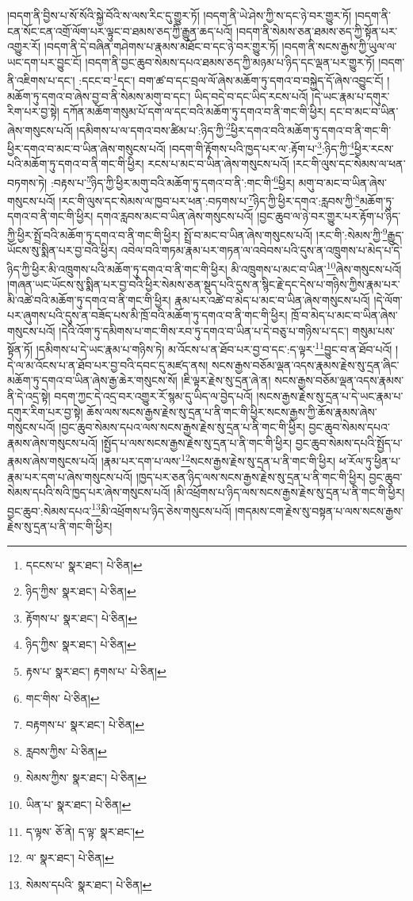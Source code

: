 །བདག་ནི་བྱིས་པ་སོ་སོའི་སྐྱེ་བོའི་ས་ལས་རིང་དུ་གྱུར་ཏོ། །བདག་ནི་ཡེ་ཤེས་ཀྱི་ས་དང་ཉེ་བར་གྱུར་ཏོ། །བདག་ནི་ངན་སོང་ངན་འགྲོ་ལོག་པར་ལྟུང་བ་ཐམས་ཅད་ཀྱི་རྒྱུན་ཆད་པའོ། །བདག་ནི་སེམས་ཅན་ཐམས་ཅད་ཀྱི་སྟོན་པར་འགྱུར་རོ། །བདག་ནི་དེ་བཞིན་གཤེགས་པ་རྣམས་མཐོང་བ་དང་ཉེ་བར་གྱུར་ཏོ། །བདག་ནི་སངས་རྒྱས་ཀྱི་ཡུལ་ལ་ཡང་དག་པར་བྱུང་ངོ། །བདག་ནི་བྱང་ཆུབ་སེམས་དཔའ་ཐམས་ཅད་ཀྱི་མཉམ་པ་ཉིད་དང་ལྡན་པར་གྱུར་ཏོ། །བདག་ནི་འཇིགས་པ་དང་། :དངང་བ་\footnote{དངངས་པ་  སྣར་ཐང་།  པེ་ཅིན། }དང་། བག་ཚ་བ་དང་བྲལ་ལོ་ཞེས་མཆོག་ཏུ་དགའ་བ་བསྐྱེད་དོ་ཞེས་འབྱུང་ངོ། །མཆོག་ཏུ་དགའ་བ་ཞེས་བྱ་བ་ནི་སེམས་མགུ་བ་དང་། ཡིད་བདེ་བ་དང་ཡིད་རངས་པའོ། །དེ་ཡང་རྣམ་པ་དགུར་རིག་པར་བྱ་སྟེ། དཀོན་མཆོག་གསུམ་པོ་དག་ལ་དང་བའི་མཆོག་ཏུ་དགའ་བ་ནི་གང་གི་ཕྱིར། དང་བ་མང་བ་ཡིན་ཞེས་གསུངས་པའོ། །དམིགས་པ་ལ་དགའ་བས་ཚིམ་པ་:ཉིད་ཀྱི་\footnote{ཉིད་ཀྱིས་  སྣར་ཐང་།  པེ་ཅིན། }ཕྱིར་དགའ་བའི་མཆོག་ཏུ་དགའ་བ་ནི་གང་གི་ཕྱིར་དགའ་བ་མང་བ་ཡིན་ཞེས་གསུངས་པའོ། །བདག་གི་རྟོགས་པའི་ཁྱད་པར་ལ་:རྟོག་པ་\footnote{རྟོགས་པ་  སྣར་ཐང་།  པེ་ཅིན། }:ཉིད་ཀྱི་\footnote{ཉིད་ཀྱིས་  སྣར་ཐང་།  པེ་ཅིན། }ཕྱིར་རངས་པའི་མཆོག་ཏུ་དགའ་བ་ནི་གང་གི་ཕྱིར། རངས་པ་མང་བ་ཡིན་ཞེས་གསུངས་པའོ། །རང་གི་ལུས་དང་སེམས་ལ་ཕན་བཏགས་ཏེ། :བརྟས་པ་\footnote{རྟས་པ་  སྣར་ཐང་། རྟགས་པ་  པེ་ཅིན། }ཉིད་ཀྱི་ཕྱིར་མགུ་བའི་མཆོག་ཏུ་དགའ་བ་ནི་:གང་གི་\footnote{གང་གིས་  པེ་ཅིན། }ཕྱིར། མགུ་བ་མང་བ་ཡིན་ཞེས་གསུངས་པའོ། །རང་གི་ལུས་དང་སེམས་ལ་ཁྱབ་པར་ཕན་:བཏགས་པ་\footnote{བརྟགས་པ་  སྣར་ཐང་།  པེ་ཅིན། }ཉིད་ཀྱི་ཕྱིར་དགའ་:རླབས་ཀྱི་\footnote{རླབས་ཀྱིས་  པེ་ཅིན། }མཆོག་ཏུ་དགའ་བ་ནི་གང་གི་ཕྱིར། དགའ་རླབས་མང་བ་ཡིན་ཞེས་གསུངས་པའོ། །བྱང་ཆུབ་ལ་ཉེ་བར་གྱུར་པར་རྟོག་པ་ཉིད་ཀྱི་ཕྱིར་སྤྲོ་བའི་མཆོག་ཏུ་དགའ་བ་ནི་གང་གི་ཕྱིར། སྤྲོ་བ་མང་བ་ཡིན་ཞེས་གསུངས་པའོ། །རང་གི་:སེམས་ཀྱི་\footnote{སེམས་ཀྱིས་  སྣར་ཐང་།  པེ་ཅིན། }རྒྱུད་ཡོངས་སུ་སྨིན་པར་བྱ་བའི་ཕྱིར། འབེལ་བའི་གཏམ་རྣམ་པར་གཏན་ལ་འབེབས་པའི་དུས་ན་འཁྲུགས་པ་མེད་པ་དེ་ཉིད་ཀྱི་ཕྱིར་མི་འཁྲུགས་པའི་མཆོག་ཏུ་དགའ་བ་ནི་གང་གི་ཕྱིར། མི་འཁྲུགས་པ་མང་བ་ཡིན་\footnote{ཡིན་པ་  སྣར་ཐང་།  པེ་ཅིན། }ཞེས་གསུངས་པའོ། །གཞན་ཡང་ཡོངས་སུ་སྨིན་པར་བྱ་བའི་ཕྱིར་སེམས་ཅན་སྡུད་པའི་དུས་ན་སྙིང་རྗེ་དང་དེས་པ་གཉིས་ཀྱིས་རྣམ་པར་མི་འཚེ་བའི་མཆོག་ཏུ་དགའ་བ་ནི་གང་གི་ཕྱིར། རྣམ་པར་འཚེ་བ་མེད་པ་མང་བ་ཡིན་ཞེས་གསུངས་པའོ། །དེ་ལོག་པར་ཞུགས་པའི་དུས་ན་བཟོད་པས་མི་ཁྲོ་བའི་མཆོག་ཏུ་དགའ་བ་ནི་གང་གི་ཕྱིར། ཁྲོ་བ་མེད་པ་མང་བ་ཡིན་ཞེས་གསུངས་པའོ། །དེའི་འོག་ཏུ་དམིགས་པ་གང་གིས་རབ་ཏུ་དགའ་བ་ཡིན་པ་དེ་བཅུ་པ་གཉིས་པ་དང་། གསུམ་པས་སྟོན་ཏོ། །དམིགས་པ་དེ་ཡང་རྣམ་པ་གཉིས་ཏེ། མ་འོངས་པ་ན་ཐོབ་པར་བྱ་བ་དང་:ད་ལྟར་\footnote{ད་ལྟས་  ཅོ་ནེ། ད་ལྟ་  སྣར་ཐང་། }བྱུང་བ་ན་ཐོབ་པའོ། །དེ་ལ་མ་འོངས་པ་ན་ཐོབ་པར་བྱ་བའི་དབང་དུ་མཛད་ནས། སངས་རྒྱས་བཅོམ་ལྡན་འདས་རྣམས་རྗེས་སུ་དྲན་ཞིང་མཆོག་ཏུ་དགའ་བ་ཡིན་ཞེས་རྒྱ་ཆེར་གསུངས་སོ། །ཇི་ལྟར་རྗེས་སུ་དྲན་ཞེ་ན། སངས་རྒྱས་བཅོམ་ལྡན་འདས་རྣམས་ནི་དེ་འདྲ་སྟེ། བདག་ཀྱང་དེ་འདྲ་བར་འགྱུར་རོ་སྙམ་དུ་ཡིད་ལ་བྱེད་པའོ། །སངས་རྒྱས་རྗེས་སུ་དྲན་པ་དེ་ཡང་རྣམ་པ་དགུར་རིག་པར་བྱ་སྟེ། ཆོས་ལས་སངས་རྒྱས་རྗེས་སུ་དྲན་པ་ནི་གང་གི་ཕྱིར་སངས་རྒྱས་ཀྱི་ཆོས་རྣམས་ཞེས་གསུངས་པའོ། །བྱང་ཆུབ་སེམས་དཔའ་ལས་སངས་རྒྱས་རྗེས་སུ་དྲན་པ་ནི་གང་གི་ཕྱིར། བྱང་ཆུབ་སེམས་དཔའ་རྣམས་ཞེས་གསུངས་པའོ། །སྤྱོད་པ་ལས་སངས་རྒྱས་རྗེས་སུ་དྲན་པ་ནི་གང་གི་ཕྱིར། བྱང་ཆུབ་སེམས་དཔའི་སྤྱོད་པ་རྣམས་ཞེས་གསུངས་པའོ། །རྣམ་པར་དག་པ་ལས་\footnote{ལ་  སྣར་ཐང་།  པེ་ཅིན། }སངས་རྒྱས་རྗེས་སུ་དྲན་པ་ནི་གང་གི་ཕྱིར། ཕ་རོལ་ཏུ་ཕྱིན་པ་རྣམ་པར་དག་པ་ཞེས་གསུངས་པའོ། །ཁྱད་པར་ཅན་ཉིད་ལས་སངས་རྒྱས་རྗེས་སུ་དྲན་པ་ནི་གང་གི་ཕྱིར། བྱང་ཆུབ་སེམས་དཔའི་སའི་ཁྱད་པར་ཞེས་གསུངས་པའོ། །མི་འཕྲོགས་པ་ཉིད་ལས་སངས་རྒྱས་རྗེས་སུ་དྲན་པ་ནི་གང་གི་ཕྱིར། བྱང་ཆུབ་:སེམས་དཔའ་\footnote{སེམས་དཔའི་  སྣར་ཐང་།  པེ་ཅིན། }མི་འཕྲོགས་པ་ཉིད་ཅེས་གསུངས་པའོ། །གདམས་ངག་རྗེས་སུ་བསྟན་པ་ལས་སངས་རྒྱས་རྗེས་སུ་དྲན་པ་ནི་གང་གི་ཕྱིར། 